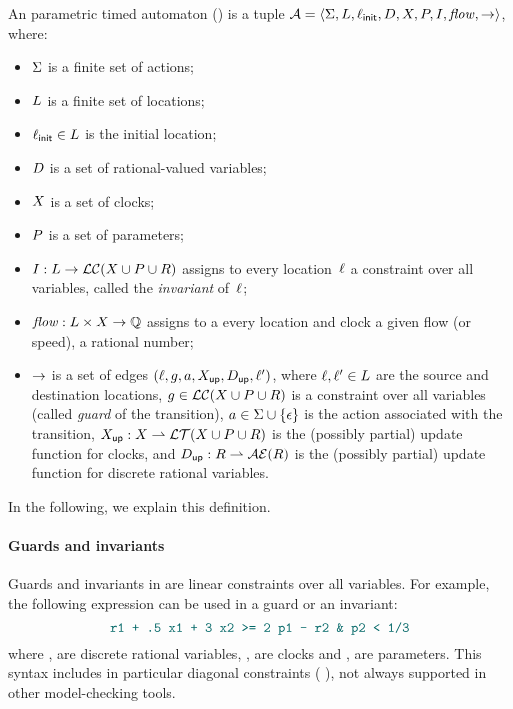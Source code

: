 \begin{definition}[\IPTA{}]\label{definition:IPTA}
	An \imitator{} parametric timed automaton (\emph{\IPTA{}}) is a tuple $\mathcal{A} = \langle\Sigma, L, \ell_{\textsf{init}}, D, X, P, I, \mathit{flow}, {\rightarrow}\rangle$, where:
	\begin{itemize}
		\item $\Sigma$ is a finite set of actions;
		\item $L$ is a finite set of locations;
		\item $\ell_{\textsf{init}} \in L$ is the initial location;
		\item $D$ is a set of rational-valued variables;
		\item $X$ is a set of clocks;
		\item $P$ is a set of parameters;
		\item $I : L \rightarrow \mathcal{LC}(X \cup P \cup R)$ assigns to every location~$\ell$ a constraint over all variables, called the \emph{invariant} of~$\ell$;
		\item $\mathit{flow} : L \times X \rightarrow \mathbb Q$ assigns to a every location and clock a given flow (or speed), \ie{} a rational number;
		\item ${\rightarrow}$ is a set of edges $(\ell, g, a, X_\mathsf{up}, D_\mathsf{up}, \ell')$, where
		      $\ell, \ell' \in L$ are the source and destination locations,
		      $g \in \mathcal{LC}(X \cup P \cup R)$ is a constraint over all variables (called \emph{guard} of the transition),
		      $a \in \Sigma \cup \{ \epsilon \}$ is the action associated with the transition,
		      $X_\mathsf{up} : X \rightharpoonup \mathcal{LT}(X \cup P \cup R)$ is the (possibly partial) update function for clocks, and
		      $D_\mathsf{up} : R \rightharpoonup \mathcal{AE}(R)$ is the (possibly partial) update function for discrete rational variables.
	\end{itemize}
\end{definition}

In the following, we explain this definition.

\paragraph{Guards and invariants}
Guards and invariants in \imitator{} are linear constraints over all variables.
For example, the following expression can be used in a guard or an invariant:
$$ \styleIMI{r1 + .5 x1 + 3 x2 >= 2 p1 - r2 \& p2 < 1/3} $$
where ,  are discrete rational variables, ,  are clocks and ,  are parameters.
This syntax includes in particular diagonal constraints (\eg{} ), not always supported in other model-checking tools.

